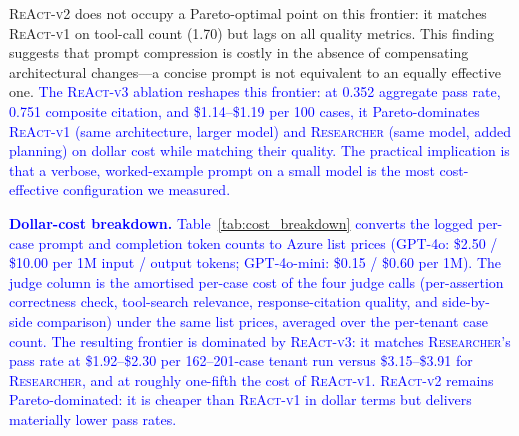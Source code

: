 \textsc{ReAct-v2} does not occupy a Pareto-optimal point on this frontier: it matches \textsc{ReAct-v1} on tool-call count (1.70) but lags on all quality metrics. This finding suggests that prompt compression is costly in the absence of compensating architectural changes---a concise prompt is not equivalent to an equally effective one. \textcolor{blue}{The \textsc{ReAct-v3} ablation reshapes this frontier: at 0.352 aggregate pass rate, 0.751 composite citation, and \$1.14--\$1.19 per 100 cases, it Pareto-dominates \textsc{ReAct-v1} (same architecture, larger model) and \textsc{Researcher} (same model, added planning) on dollar cost while matching their quality. The practical implication is that a verbose, worked-example prompt on a small model is the most cost-effective configuration we measured.}

\noindent\textbf{\textcolor{blue}{Dollar-cost breakdown.}} \textcolor{blue}{Table~\ref{tab:cost_breakdown} converts the logged per-case prompt and completion token counts to Azure list prices (GPT-4o: \$2.50 / \$10.00 per 1M input / output tokens; GPT-4o-mini: \$0.15 / \$0.60 per 1M). The judge column is the amortised per-case cost of the four judge calls (per-assertion correctness check, tool-search relevance, response-citation quality, and side-by-side comparison) under the same list prices, averaged over the per-tenant case count. The resulting frontier is dominated by \textsc{ReAct-v3}: it matches \textsc{Researcher}'s pass rate at \$1.92--\$2.30 per 162--201-case tenant run versus \$3.15--\$3.91 for \textsc{Researcher}, and at roughly one-fifth the cost of \textsc{ReAct-v1}. \textsc{ReAct-v2} remains Pareto-dominated: it is cheaper than \textsc{ReAct-v1} in dollar terms but delivers materially lower pass rates.}

